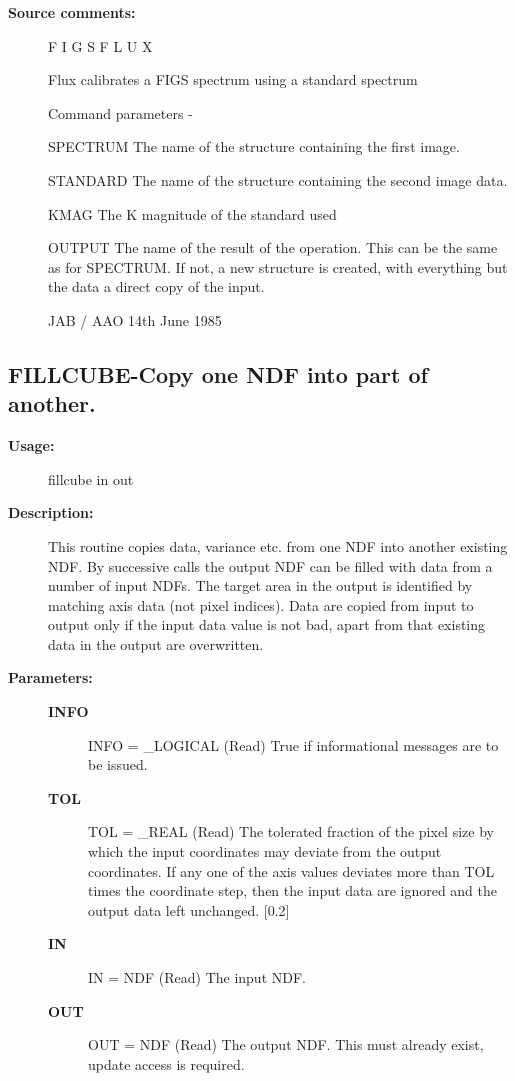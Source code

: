 \begin{description}
\begin{description}
\item [\textbf{Source comments:}]
\begin{terminalv}
 F I G S F L U X

 Flux calibrates a FIGS spectrum using a standard spectrum

 Command parameters -

 SPECTRUM  The name of the structure containing the first image.

 STANDARD  The name of the structure containing the second
           image data.

 KMAG      The K magnitude of the standard used

 OUTPUT    The name of the result of the operation.  This can
           be the same as for SPECTRUM.  If not, a new structure
           is created, with everything but the data a direct
           copy of the input.

                                      JAB / AAO  14th June 1985
\end{terminalv}
\end{description}
\subsection{FILLCUBE-\label{FILLCUBE}Copy one NDF into part of another.}
\begin{description}

\item [\textbf{Usage:}]

   fillcube in out


\item [\textbf{Description:}]
   This routine copies data, variance etc. from one NDF into another
   existing NDF. By successive calls the output NDF can be filled
   with data from a number of input NDFs. The target area in the
   output is identified by matching axis data (not pixel indices).
   Data are copied from input to output only if the input data value
   is not bad, apart from that existing data in the output are
   overwritten.


\item [\textbf{Parameters:}]
\begin{description}
\item [\textbf{INFO}]
INFO = \_LOGICAL (Read)
   True if informational messages are to be issued.
\item [\textbf{TOL}]
TOL = \_REAL (Read)
   The tolerated fraction of the pixel size by which the input
   coordinates may deviate from the output coordinates. If any one
   of the axis values deviates more than TOL times the coordinate
   step, then the input data are ignored and the output data left
   unchanged. [0.2]
\item [\textbf{IN}]
IN = NDF (Read)
   The input NDF.
\item [\textbf{OUT}]
OUT = NDF (Read)
   The output NDF. This must already exist, update access is
   required.


\end{description}
\end{description}
\end{description}
